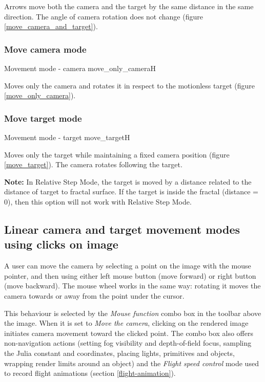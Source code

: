 Arrows move both the camera and the target by the same distance in the same direction. The angle of camera rotation does not change (figure \ref{move_camera_and_target}).

\subsubsection{Move camera mode}\label{move-camera-mode}

{Movement mode - camera}
{move_only_camera}{H}

Moves only the camera and rotates it in respect to the motionless target (figure \ref{move_only_camera}).

\subsubsection{Move target mode}\label{move-target-mode}

{Movement mode - target}
{move_target}{H}

Moves only the target while maintaining a fixed camera position (figure \ref{move_target}). The camera rotates following the target. 

\textbf{Note:} In Relative Step Mode, the target is moved by a distance related to the distance of target to fractal surface. If the target is inside the fractal (distance = 0), then this option will not work with Relative Step Mode.

\subsection{Linear camera and target movement modes using clicks on image}\label{linear-camera-and-target-movement-modes-using-the-mouse-pointer}

A user can move the camera by selecting a point on the image with the mouse pointer, and then using either left mouse button (move forward) or right button (move backward). The mouse wheel works in the same way: rotating it moves the camera towards or away from the point under the cursor.

This behaviour is selected by the \emph{Mouse function} combo box in the toolbar above the image. When it is set to \emph{Move the camera}, clicking on the rendered image initiates camera movement toward the clicked point. The combo box also offers non-navigation actions (setting fog visibility and depth-of-field focus, sampling the Julia constant and coordinates, placing lights, primitives and objects, wrapping render limits around an object) and the \emph{Flight speed control} mode used to record flight animations (section \ref{flight-animation}).

